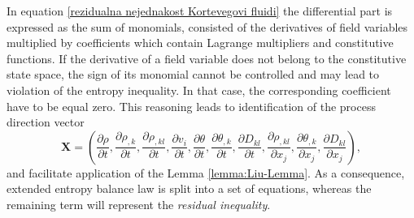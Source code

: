 \documentclass[a4paper,fleqn]{cas-sc}
\theoremstyle{definition}
\begin{document}
In equation \eqref{rezidualna nejednakost Kortevegovi fluidi} the differential part is expressed as the sum of monomials, consisted of the derivatives of field variables multiplied by coefficients which contain Lagrange multipliers and constitutive functions. If the derivative of a field variable does not belong to the constitutive state space, the sign of its monomial cannot be controlled and may lead to violation of the entropy inequality. In that case, the corresponding coefficient have to be equal zero. This reasoning leads to identification of the process direction vector
\begin{equation} \label{ProcessDirectionVector-Korteweg}
	\mathbf{X} = \left( \dfrac{\partial \rho}{\partial t}, \dfrac{\partial\rho_{,k}}{\partial t}, \dfrac{\partial\rho_{,kl}}{\partial t}, \dfrac{\partial v_i}{\partial t}, 
	\dfrac{\partial \theta}{\partial t}, \dfrac{\partial \theta_{,k}}{\partial t}, \dfrac{\partial D_{kl}}{\partial t}, \dfrac{\partial \rho_{,kl}}{\partial x_j}, 
	\dfrac{\partial \theta_{,k}}{\partial x_j}, \dfrac{\partial D_{kl}}{\partial x_{j}} \right), 
\end{equation}
and facilitate application of the Lemma \ref{lemma:Liu-Lemma}. As a consequence, extended entropy balance law is split into a set of equations, whereas the remaining term will represent the \emph{residual inequality}. 
\end{document}
